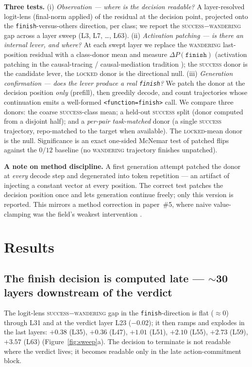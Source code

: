 \documentclass[11pt]{article}
\begin{document}
\textbf{Three tests.} (i) \emph{Observation --- where is the decision readable?} A layer-resolved logit-lens (final-norm applied) of the residual at the decision point, projected onto the \texttt{finish}-versus-others direction, per class; we report the \textsc{success}$-$\textsc{wandering} gap across a layer sweep (L3, L7, \dots, L63). (ii) \emph{Activation patching --- is there an internal lever, and where?} At each swept layer we replace the \textsc{wandering} last-position residual with a class-donor mean and measure $\Delta P(\texttt{finish})$ (activation patching in the causal-tracing / causal-mediation tradition \cite{rome,vig}); the \textsc{success} donor is the candidate lever, the \textsc{locked} donor is the directional null. (iii) \emph{Generation confirmation --- does the lever produce a real \texttt{finish}?} We patch the donor at the decision position \emph{only} (prefill), then greedily decode, and count trajectories whose continuation emits a well-formed \texttt{<function=finish>} call. We compare three donors: the coarse \textsc{success}-class mean; a held-out \textsc{success} split (donor computed from a disjoint half); and a \emph{per-pair task-matched} donor (a single \textsc{success} trajectory, repo-matched to the target when available). The \textsc{locked}-mean donor is the null. Significance is an exact one-sided McNemar test of patched flips against the $0/12$ baseline (no \textsc{wandering} trajectory finishes unpatched).

\textbf{A note on method discipline.} A first generation attempt patched the donor at \emph{every} decode step and degenerated into token repetition --- an artifact of injecting a constant vector at every position. The correct test patches the decision position once and lets generation continue freely; only this version is reported. This mirrors a method correction in paper~\#5, where naive value-clamping was the field's weakest intervention \cite{verdict_circuit}.

\section{Results}\label{sec:results}

\subsection{The finish decision is computed late --- $\sim$30 layers downstream of the verdict}
The logit-lens \textsc{success}$-$\textsc{wandering} gap in the \texttt{finish}-direction is flat ($\approx 0$) through L31 and at the verdict layer L23 ($-0.02$); it then ramps and explodes in the last layers: $+0.38$ (L35), $+0.36$ (L47), $+1.01$ (L51), $+2.10$ (L55), $+2.73$ (L59), $+3.57$ (L63) (Figure~\ref{fig:sweep}a). The decision to terminate is not readable where the verdict lives; it becomes readable only in the late action-commitment block.
\end{document}
